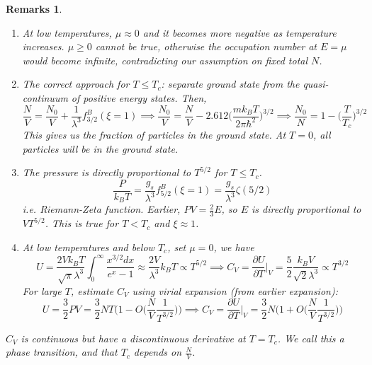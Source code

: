 \documentclass[a4paper]{article}
\newtheorem{remarks}{Remarks}[section]
\theoremstyle{new}
\begin{document}
\begin{remarks}\leavevmode
\begin{enumerate}
    \item At low temperatures, $\mu\approx 0$ and it becomes more negative as temperature increases. $\mu\geq0$ cannot be true, otherwise the occupation number at $E=\mu$ would become infinite, contradicting our assumption on fixed total $N$.
    \item The correct approach for $T\leq T_c$: separate ground state from the quasi-continuum of positive energy states. Then,
$$\frac{N}{V}=\frac{N_0}{V}+\frac{1}{\lambda^3}f_{3/2}^B(\xi=1)\implies\frac{N_0}{V}=\frac{N}{V}-2.612\bigg(\frac{mk_BT}{2\pi\hbar^2}\bigg)^{3/2}\implies\frac{N_0}{N}=1-\bigg(\frac{T}{T_c}\bigg)^{3/2}$$
This gives us the fraction of particles in the ground state. At $T=0$, all particles will be in the ground state.
\begin{center}
\end{center}
\item The pressure is directly proportional to $T^{5/2}$ for $T\leq T_c$.
$$\frac{P}{k_BT}=\frac{g_s}{\lambda^3}f_{5/2}^B(\xi=1)=\frac{g_s}{\lambda^3}\zeta(5/2)$$
i.e. Riemann-Zeta function. Earlier, $PV=\frac{2}{3}E$, so $E$ is directly proportional to $VT^{5/2}$. This is true for $T< T_c$ and $\xi\approx 1$. 
\item At low temperatures and below $T_c$, set $\mu=0$, we have
$$U=\frac{2Vk_BT}{\sqrt{\pi}\lambda^3}\int_0^\infty\frac{x^{3/2}dx}{e^x-1}\approx\frac{2V}{\lambda^3}k_BT\propto T^{5/2}\implies C_V=\frac{\partial U}{\partial T}\bigg|_V=\frac{5}{2}\frac{k_BV}{\sqrt{2}\lambda^3}\propto T^{3/2}$$
For large $T$, estimate $C_V$ using virial expansion (from earlier expansion):
$$U=\frac{3}{2}PV=\frac{3}{2}NT\bigg(1-O\bigg(\frac{N}{V}\frac{1}{T^{3/2}}\bigg)\bigg)\implies C_V=\frac{\partial U}{\partial T}\bigg|_V=\frac{3}{2}N\bigg(1+O\bigg(\frac{N}{V}\frac{1}{T^{3/2}}\bigg)\bigg)$$
\begin{center}
\end{center}
\end{enumerate}
\item $C_V$ is continuous but have a discontinuous derivative at $T=T_c$. We call this a phase transition, and that $T_c$ depends on $\frac{N}{V}$.
\end{remarks}
\end{document}

